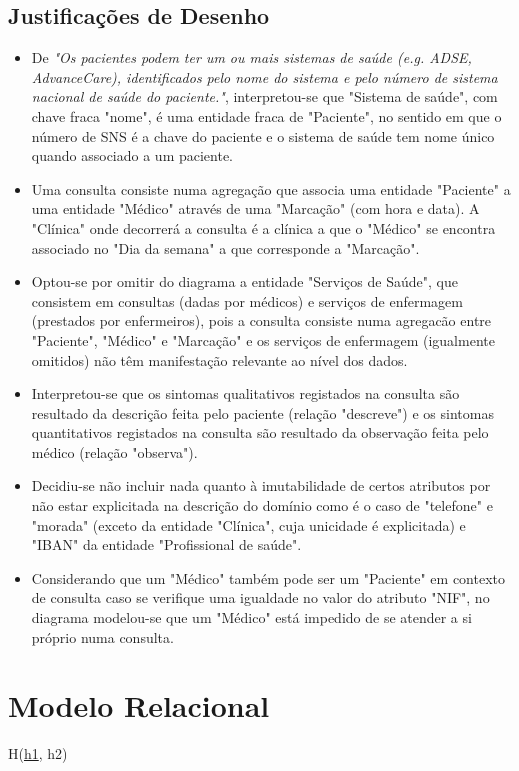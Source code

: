 \documentclass[12pt,a4paper]{article}
\begin{document}
  \subsection*{Justificações de Desenho}
  \normalsize
  \begin{itemize}
    \item De \textit{"Os pacientes podem
ter um ou mais sistemas de saúde (e.g. ADSE, AdvanceCare), identificados pelo nome do sistema e pelo
número de sistema nacional de saúde do paciente."}, interpretou-se que "Sistema de saúde", com chave fraca "nome", é uma entidade fraca de "Paciente", no sentido em que o número de SNS é a chave do paciente e o sistema de saúde tem nome único quando associado a um paciente.
    \item Uma consulta consiste numa agregação que associa uma entidade "Paciente" a uma entidade  "Médico" através de uma "Marcação" (com hora e data). A "Clínica" onde decorrerá a consulta é a clínica a que o "Médico" se encontra associado no "Dia da semana" a que corresponde a "Marcação".
    \item Optou-se por omitir do diagrama a entidade "Serviços de Saúde", que consistem em consultas (dadas por médicos) e serviços de enfermagem (prestados por enfermeiros), pois a consulta consiste numa agregacão entre "Paciente", "Médico" e "Marcação" e os serviços de enfermagem (igualmente omitidos) não têm manifestação relevante ao nível dos dados.
    \item Interpretou-se que os sintomas qualitativos registados na consulta são resultado da descrição feita pelo paciente (relação "descreve") e os sintomas quantitativos registados na consulta são resultado da observação feita pelo médico (relação "observa").
    \item Decidiu-se não incluir nada quanto à imutabilidade de certos atributos por não estar explicitada na descrição do domínio como é o caso de "telefone" e "morada" (exceto da entidade "Clínica", cuja unicidade é explicitada) e "IBAN" da entidade "Profissional de saúde".
    \item Considerando que um "Médico" também pode ser um "Paciente" em contexto de consulta caso se verifique uma igualdade no valor do atributo "NIF", no diagrama modelou-se que um "Médico" está impedido de se atender a si próprio numa consulta.
     
  \end{itemize}
  
\newpage
\section*{Modelo Relacional}
  \ttfamily
  \noindent
  H(\underline{h1}, h2)
\end{document}
